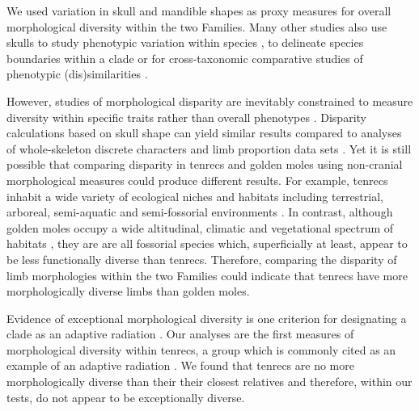 \documentclass[12pt,a4paper]{article}
\begin{document}
	
	
	We used variation in skull and mandible shapes as proxy measures for overall morphological diversity within the two Families. Many other studies also use skulls to study phenotypic variation within species \citep{Blagojevic2011, Bornholdt2008}, to delineate species boundaries within a clade \citep[e.g.][]{Panchetti2008} or for cross-taxonomic comparative studies of phenotypic (dis)similarities \citep[e.g.][]{Ruta2013, Goswami2011, Wroe2007}.
	
	However, studies of morphological disparity are inevitably constrained to measure diversity within specific traits rather than overall phenotypes \citep{Roy1997}. Disparity calculations based on skull shape can yield similar results compared to analyses of whole-skeleton discrete characters and limb proportion data sets \citep{Foth2012}. Yet it is still possible that comparing disparity in tenrecs and golden moles using non-cranial morphological measures could produce different results. For example, tenrecs inhabit a wide variety of ecological niches and habitats including terrestrial, arboreal, semi-aquatic and semi-fossorial environments \citep{Soarimalala2011}. In contrast, although golden moles occupy a wide altitudinal, climatic and vegetational spectrum of habitats \citep{Bronner1995}, they are are all fossorial species which, superficially at least, appear to be less functionally diverse than tenrecs. Therefore, comparing the disparity of limb morphologies within the two Families could indicate that tenrecs have more morphologically diverse limbs than golden moles. 
	
	

 	Evidence of exceptional morphological diversity is one criterion for designating a clade as an adaptive radiation \citep{Losos2010a}. Our analyses are the first measures of morphological diversity within tenrecs, a group which is commonly cited as an example of an adaptive radiation \citep{Olson2013}. We found that tenrecs are no more morphologically diverse than their their closest relatives and therefore, within our tests, do not appear to be exceptionally diverse.   
 	
\end{document}
